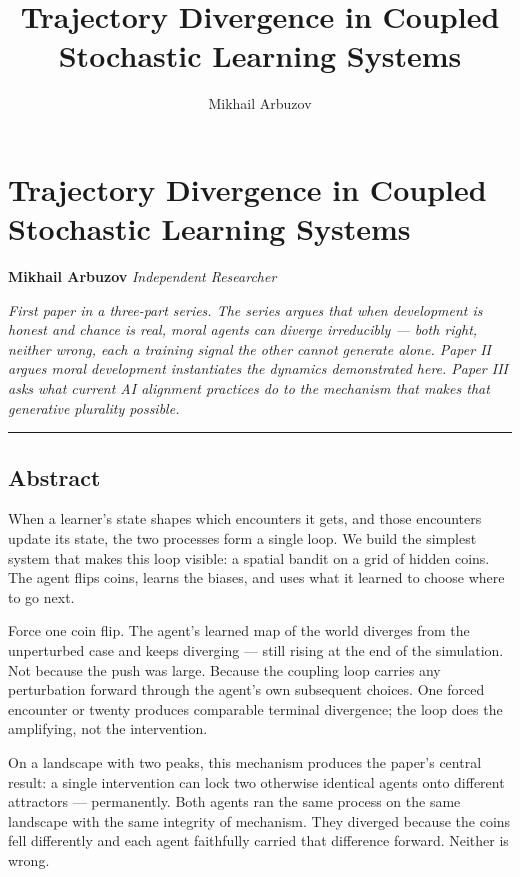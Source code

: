 \documentclass[
]{article}
\title{Trajectory Divergence in Coupled Stochastic Learning Systems}
\author{Mikhail Arbuzov}
\date{}
\begin{document}
\maketitle

\section{Trajectory Divergence in Coupled Stochastic Learning
Systems}\label{trajectory-divergence-in-coupled-stochastic-learning-systems}

\textbf{Mikhail Arbuzov} \emph{Independent Researcher}

\emph{First paper in a three-part series. The series argues that when
development is honest and chance is real, moral agents can diverge
irreducibly --- both right, neither wrong, each a training signal the
other cannot generate alone. Paper II argues moral development
instantiates the dynamics demonstrated here. Paper III asks what current
AI alignment practices do to the mechanism that makes that generative
plurality possible.}

\begin{center}\rule{0.5\linewidth}{0.5pt}\end{center}

\subsection{Abstract}\label{abstract}

When a learner's state shapes which encounters it gets, and those
encounters update its state, the two processes form a single loop. We
build the simplest system that makes this loop visible: a spatial bandit
on a grid of hidden coins. The agent flips coins, learns the biases, and
uses what it learned to choose where to go next.

Force one coin flip. The agent's learned map of the world diverges from
the unperturbed case and keeps diverging --- still rising at the end of
the simulation. Not because the push was large. Because the coupling
loop carries any perturbation forward through the agent's own subsequent
choices. One forced encounter or twenty produces comparable terminal
divergence; the loop does the amplifying, not the intervention.

On a landscape with two peaks, this mechanism produces the paper's
central result: a single intervention can lock two otherwise identical
agents onto different attractors --- permanently. Both agents ran the
same process on the same landscape with the same integrity of mechanism.
They diverged because the coins fell differently and each agent
faithfully carried that difference forward. Neither is wrong.
\end{document}
